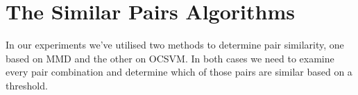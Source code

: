 \documentclass{mpaper}
\begin{document}

    


\section{The Similar Pairs Algorithms}

In our experiments we've utilised two methods to determine pair similarity, one based on MMD and the other on OCSVM. In both cases we need to examine every pair combination and determine which of those pairs are similar based on a threshold. 


\SetInd{0.1em}{0.75em}
\SetNlSkip{0.5em}
\end{document}
